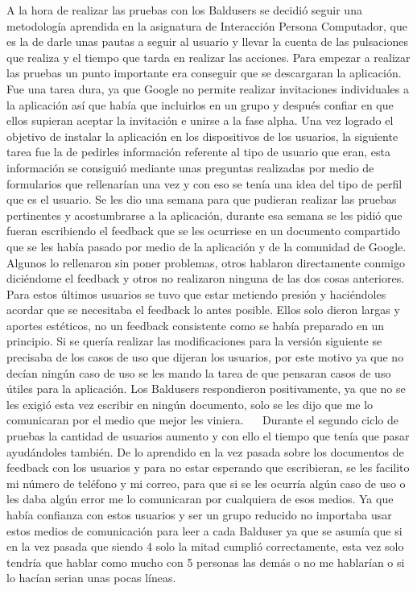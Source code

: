 A la hora de realizar las pruebas con los Baldusers se decidió seguir una metodología aprendida en la asignatura de Interacción Persona Computador, que es la de darle unas pautas a seguir al usuario y llevar la cuenta de las pulsaciones que realiza y el tiempo que tarda en realizar las acciones.
Para empezar a realizar las pruebas un punto importante era conseguir que se descargaran la aplicación.
Fue una tarea dura, ya que Google no permite realizar invitaciones individuales a la aplicación así que había que incluirlos en un grupo y después confiar en que ellos supieran aceptar la invitación e unirse a la fase alpha.
Una vez logrado el objetivo de instalar la aplicación en los dispositivos de los usuarios, la siguiente tarea fue la de pedirles información referente al tipo de usuario que eran, esta información se consiguió mediante unas preguntas realizadas por medio de formularios que rellenarían una vez y con eso se tenía una idea del tipo de perfil que es el usuario. 
Se les dio una semana para que pudieran realizar las pruebas pertinentes y acostumbrarse a la aplicación, durante esa semana se les pidió que fueran escribiendo el feedback que se les ocurriese en un documento compartido que se les había pasado por medio de la aplicación y de la comunidad de Google.
Algunos lo rellenaron sin poner problemas, otros hablaron directamente conmigo diciéndome el feedback y otros no realizaron ninguna de las dos cosas anteriores.
Para estos últimos usuarios se tuvo que estar metiendo presión y haciéndoles acordar que se necesitaba el feedback lo antes posible. Ellos solo dieron largas y aportes estéticos, no un feedback consistente como se había preparado en un principio.
Si se quería realizar las modificaciones para la versión siguiente se precisaba de los casos de uso que dijeran los usuarios, por este motivo ya que no decían ningún caso de uso se les mando la tarea de que pensaran casos de uso útiles para la aplicación.
Los Baldusers respondieron positivamente, ya que no se les exigió esta vez escribir en ningún documento, solo se les dijo que me lo comunicaran por el medio que mejor les viniera.
 
Durante el segundo ciclo de pruebas la cantidad de usuarios aumento y con ello el tiempo que tenía que pasar ayudándoles también.
De lo aprendido en la vez pasada sobre los documentos de feedback con los usuarios y para no estar esperando que escribieran, se les facilito mi número de teléfono y mi correo, para que si se les ocurría algún caso de uso o les daba algún error me lo comunicaran por cualquiera de esos medios. Ya que había confianza con estos usuarios y ser un grupo reducido no importaba usar estos medios de comunicación para leer a cada Balduser ya que se asumía que si en la vez pasada que siendo 4 solo la mitad cumplió correctamente, esta vez solo tendría que hablar como mucho con 5 personas las demás o no me hablarían o si lo hacían serian unas pocas líneas.

